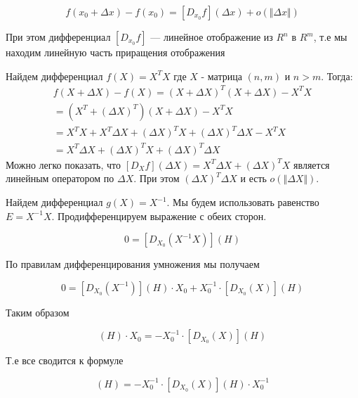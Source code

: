 \documentclass{article}
\begin{document}
    \begin{equation}
        f(x_{0} + \Delta x) - f(x_{0}) = [D_{x_{0}} f](\Delta x) + o(\Vert \Delta x \Vert)
    \end{equation}

    При этом дифференциал $[D_{x_{0}} f]$ --- линейное отображение из $R^{n}$ в $R^{m}$, т.е мы находим линейную часть приращения отображения

    \quad

    Найдем дифференциал $f(X) = X^{T} X$ где $X$ - матрица $(n, m)$ и $n > m$.
    Тогда:
    \[
    \begin{gathered}
        f(X + \Delta X) - f(X) = (X + \Delta X)^{T} (X + \Delta X) - X^{T} X \\
        = (X^{T} + (\Delta X)^{T}) (X + \Delta X) - X^{T} X \\
        = X^{T} X + X^{T} \Delta X + (\Delta X)^{T} X + (\Delta X)^{T} \Delta X - X^{T} X \\
        = X^{T} \Delta X + (\Delta X)^{T} X + (\Delta X)^{T} \Delta X
    \end{gathered}
    \]
    Можно легко показать, что $[D_{X} f](\Delta X) = X^{T} \Delta X + (\Delta X)^{T} X$ является линейным оператором по $\Delta X$.
    При этом $(\Delta X)^{T} \Delta X$ и есть $o(\Vert \Delta X \Vert)$.

    \quad

    Найдем дифференциал $g(X) = X^{-1}$.
    Мы будем использовать равенство $E = X^{-1} X$.
    Продифференцируем выражение с обеих сторон.

    \begin{equation}
        0 = [D_{X_{0}} (X^{-1} X)](H)
    \end{equation}

    По правилам дифференцирования умножения мы получаем

    \begin{equation}
        0 = [D_{X_{0}} (X^{-1})](H) \cdot X_{0} + X_{0}^{-1} \cdot [D_{X_{0}} (X)](H)
    \end{equation}

    Таким образом

    \begin{equation}
        [D_{X_{0}} (X^{-1})](H) \cdot X_{0} = - X_{0}^{-1} \cdot [D_{X_{0}} (X)](H)
    \end{equation}

    Т.е все сводится к формуле

    \begin{equation}
        [D_{X_{0}} (X^{-1})](H) = - X_{0}^{-1} \cdot [D_{X_{0}} (X)](H) \cdot X_{0}^{-1}
    \end{equation}
\end{document}

